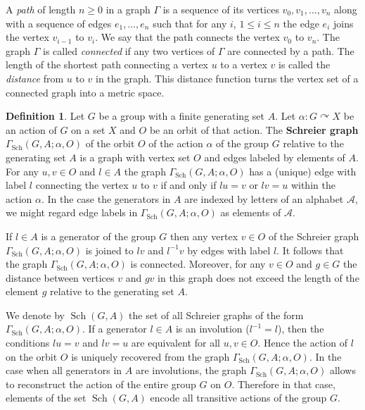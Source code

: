 \documentclass[12pt]{article}
\theoremstyle{definition}
\newtheorem{definition}[theorem]{Definition}
\def\cA{\mathcal{A}}
\def\al{\alpha}
\def\Sch{\mathop{\mathrm{Sch}}}
\begin{document}
A \emph{path} of length $n\ge0$ in a graph $\Gamma$ is a sequence of its 
vertices $v_0,v_1,\dots,v_n$ along with a sequence of edges $e_1,\dots,e_n$ 
such that for any $i$, $1\le i\le n$ the edge $e_i$ joins the vertex 
$v_{i-1}$ to $v_i$.  We say that the path connects the vertex $v_0$ to 
$v_n$.  The graph $\Gamma$ is called \emph{connected} if any two vertices 
of $\Gamma$ are connected by a path.  The length of the shortest path 
connecting a vertex $u$ to a vertex $v$ is called the \emph{distance} from 
$u$ to $v$ in the graph.  This distance function turns the vertex set of a 
connected graph into a metric space.

\begin{definition}\label{def-Schr}
Let $G$ be a group with a finite generating set $A$.  Let 
$\alpha:G\curvearrowright X$ be an action of $G$ on a set $X$ and $O$ be an 
orbit of that action.  The \textbf{Schreier graph} 
$\Gamma_{\Sch}(G,A;\al,O)$ of the orbit $O$ of the action $\alpha$ of the 
group $G$ relative to the generating set $A$ is a graph with vertex set $O$ 
and edges labeled by elements of $A$.  For any $u,v\in O$ and $l\in A$ the 
graph $\Gamma_{\Sch}(G,A;\al,O)$ has a (unique) edge with label $l$ 
connecting the vertex $u$ to $v$ if and only if $lu=v$ or $lv=u$ within the 
action $\al$.  In the case the generators in $A$ are indexed by letters of 
an alphabet $\cA$, we might regard edge labels in 
$\Gamma_{\Sch}(G,A;\al,O)$ as elements of $\cA$.
\end{definition}

If $l\in A$ is a generator of the group $G$ then any vertex $v\in O$ of the 
Schreier graph $\Gamma_{\Sch}(G,A;\al,O)$ is joined to $lv$ and $l^{-1}v$ 
by edges with label $l$.  It follows that the graph 
$\Gamma_{\Sch}(G,A;\al,O)$ is connected.  Moreover, for any $v\in O$ and 
$g\in G$ the distance between vertices $v$ and $gv$ in this graph does not 
exceed the length of the element $g$ relative to the generating set $A$.

We denote by $\Sch(G,A)$ the set of all Schreier graphs of the form 
$\Gamma_{\Sch}(G,A;\al,O)$.  If a generator $l\in A$ is an involution 
($l^{-1}=l$), then the conditions $lu=v$ and $lv=u$ are equivalent for all 
$u,v\in O$.  Hence the action of $l$ on the orbit $O$ is uniquely recovered 
from the graph $\Gamma_{\Sch}(G,A;\al,O)$.  In the case when all generators 
in $A$ are involutions, the graph $\Gamma_{\Sch}(G,A;\al,O)$ allows to 
reconstruct the action of the entire group $G$ on $O$.  Therefore in that 
case, elements of the set $\Sch(G,A)$ encode all transitive actions of the 
group $G$.
\end{document}
